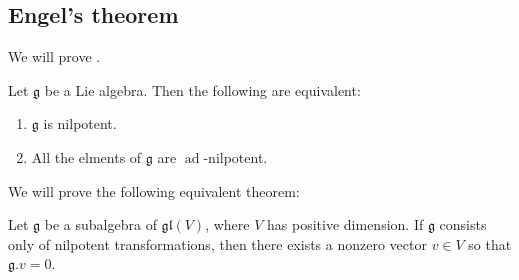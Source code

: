 \documentclass{article}
\DeclareMathOperator{\ad}{ad}
\newcommand*\frkg{{\ensuremath{\mathfrak{g}}}}
\newcommand*\glalg{\ensuremath{\mathfrak{gl}}}
\newcommand*\acts{.}
\begin{document}
\subsection{Engel's theorem}

We will prove .

\begin{theorem}[Engel]
    Let $\frkg$ be a Lie algebra.
    Then the following are equivalent:
    \begin{enumerate}[label=(\roman*)]
        \item 
            $\frkg$ is nilpotent.
        \item 
            All the elments of $\frkg$ are $\ad$-nilpotent.
    \end{enumerate}
\end{theorem}

We will prove the following equivalent theorem:

\begin{theorem}
    Let $\frkg$ be a subalgebra of $\glalg(V)$, where $V$ has positive dimension.
    If $\frkg$ consists only of nilpotent transformations, then there exists a nonzero vector $v \in V$ so that $\frkg \acts v = 0$.
\end{theorem}
\end{document}
